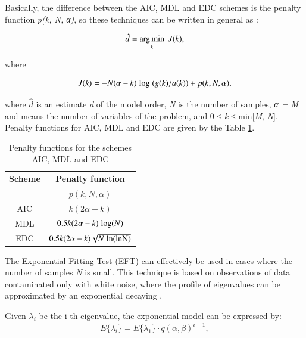 \documentclass[review]{elsarticle}
\DeclareMathOperator*{\argmin}{arg\,min}
\begin{document}
Basically, the difference between the AIC, MDL and EDC schemes is the penalty function \emph{p(k, N, α)}, so these techniques can be written in general as \cite{da2009comparison}:

\begin{equation}\label{eq:eq1}
\hat{d} = \argmin\limits_k \hspace{1 mm} J(k), 
\end{equation}

where

\begin{equation}\label{eq:eq2}
J(k) = -N(\alpha - k) \hspace{1 mm} {\rm log} \hspace{1 mm} (g(k)/a(k)) + p(k,N,\alpha),
\end{equation}

where $\hat{d}$ is an estimate \emph{d} of the model order, \emph{N} is the number of samples, \emph{α = M} and means the number of variables of the problem, and 0 ≤ \emph{k} ≤ min[\emph{M}, \emph{N}]. Penalty functions for AIC, MDL and EDC are given by the Table \ref{tab:tab2}.

\begin{table}[h!]
  \centering
  \caption{Penalty functions for the schemes AIC, MDL and EDC}
  \label{tab:tab2}
  \begin{tabular}{*2c}
	\toprule
	\textbf{Scheme} &  \textbf{Penalty function} \\
	\textbf{} &  $p(k,N,\alpha)$ \\
	\midrule
    AIC	& $k(2\alpha - k)$ \\
    MDL	& $0.5k(2\alpha - k) \hspace{1 mm} {\rm log} (N)$ \\
    EDC	& $0.5k(2\alpha - k)\sqrt{N\hspace{1 mm}\rm ln(\rm ln N)}$ \\
    \bottomrule
  \end{tabular}
\end{table}

The Exponential Fitting Test (EFT) can effectively be used in cases where the number of samples \emph{N} is small. This technique is based on observations of data contaminated only with white noise, where the profile of eigenvalues can be approximated by an exponential decaying \cite{grouffaud1996some}.

Given $\lambda_i$ be the i-th eigenvalue, the exponential model can be expressed by:
\begin{equation}\label{eq:eq3}
E\{\lambda_i\} = E\{\lambda_1\} \cdot q(\alpha,\beta)^{i-1},
\end{equation}
\end{document}
